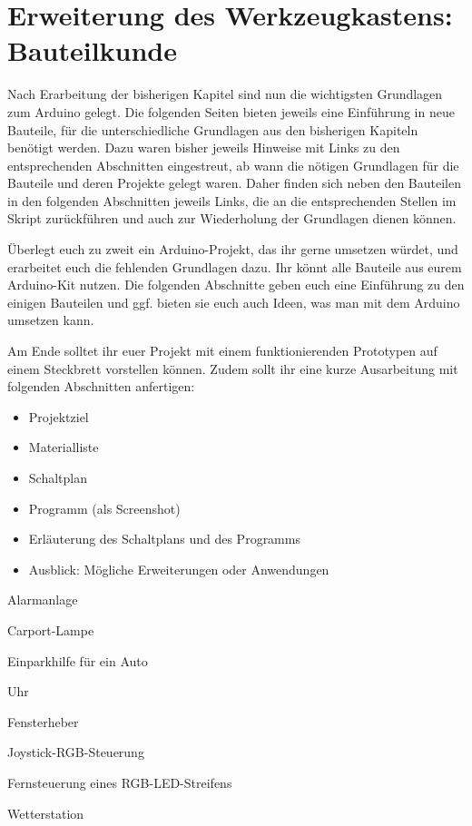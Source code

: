 \chapter{Erweiterung des Werkzeugkastens: Bauteilkunde}

Nach Erarbeitung der bisherigen Kapitel sind nun die wichtigsten Grundlagen zum Arduino gelegt. Die folgenden Seiten bieten jeweils eine Einführung in neue Bauteile, für die unterschiedliche Grundlagen aus den bisherigen Kapiteln benötigt werden. Dazu waren bisher jeweils Hinweise mit Links zu den entsprechenden Abschnitten eingestreut, ab wann die nötigen Grundlagen für die Bauteile und deren Projekte gelegt waren. Daher finden sich neben den Bauteilen in den folgenden Abschnitten jeweils Links, die an die entsprechenden Stellen im Skript zurückführen und auch zur Wiederholung der Grundlagen dienen können.

\medskip
\begin{ziel}
	Überlegt euch zu zweit ein Arduino-Projekt, das ihr gerne umsetzen würdet, und erarbeitet euch die fehlenden Grundlagen dazu. Ihr könnt alle Bauteile aus eurem Arduino-Kit nutzen. Die folgenden Abschnitte geben euch eine Einführung zu den einigen Bauteilen und ggf. bieten sie euch auch Ideen, was man mit dem Arduino umsetzen kann.
	
	Am Ende solltet ihr euer Projekt mit einem funktionierenden Prototypen auf einem Steckbrett vorstellen können. Zudem sollt ihr eine kurze Ausarbeitung mit folgenden Abschnitten anfertigen:
	\begin{multicols}{2}
		\begin{itemize}[parsep=0mm, itemsep=0ex]
			\item Projektziel
			\item Materialliste
			\item Schaltplan
			\item Programm (als Screenshot)
			\item Erläuterung des Schaltplans und des Programms
			\item Ausblick: Mögliche Erweiterungen oder Anwendungen
		\end{itemize}
	\end{multicols}
\end{ziel}

\bigskip

\begin{projektueberblick}
	\item Alarmanlage \dotfill \pageref{proj:neigungsalarmanlage}
	\item Carport-Lampe \dotfill \pageref{proj:carport}
	\item Einparkhilfe für ein Auto \dotfill \pageref{proj:einparkhilfe}
	\item Uhr \dotfill \pageref{proj:uhr}
	\item Fensterheber \dotfill \pageref{proj:fensterheber}
	\item Joystick-RGB-Steuerung \dotfill \pageref{proj:joystick-rgb}
	\item Fernsteuerung eines RGB-LED-Streifens \dotfill \pageref{proj:fernsteuerung-rgb}
	\item Wetterstation \dotfill \pageref{proj:wetterstation}
\end{projektueberblick}

